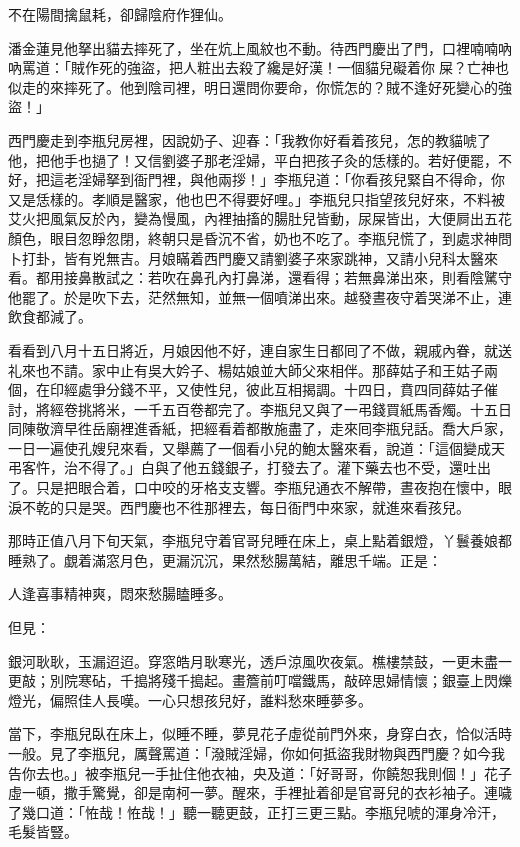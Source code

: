 不在陽間擒鼠耗，卻歸陰府作狸仙。

潘金蓮見他拏出貓去摔死了，坐在炕上風紋也不動。待西門慶出了門，口裡喃喃吶吶罵道：「賊作死的強盜，把人粧出去殺了纔是好漢！一個貓兒礙着你𠳹屎？亡神也似走的來摔死了。他到陰司裡，明日還問你要命，你慌怎的？賊不逢好死變心的強盜！」{}

西門慶走到李瓶兒房裡，因說奶子、迎春：「我教你好看着孩兒，怎的教貓唬了他，把他手也撾了！又信劉婆子那老淫婦，平白把孩子灸的恁樣的。若好便罷，不好，把這老淫婦拏到衙門裡，與他兩拶！」李瓶兒道：「你看孩兒緊自不得命，你又是恁樣的。孝順是醫家，他也巴不得要好哩。」李瓶兒只指望孩兒好來，不料被艾火把風氣反於內，變為慢風，內裡抽搐的腸肚兒皆動，尿屎皆出，大便屙出五花顏色，眼目忽睜忽閉，終朝只是昏沉不省，奶也不吃了。李瓶兒慌了，到處求神問卜打卦，皆有兇無吉。月娘瞞着西門慶又請劉婆子來家跳神，又請小兒科太醫來看。都用接鼻散試之：若吹在鼻孔內打鼻涕，還看得；若無鼻涕出來，則看陰騭守他罷了。於是吹下去，茫然無知，並無一個噴涕出來。越發晝夜守着哭涕不止，連飲食都減了。

看看到八月十五日將近，月娘因他不好，連自家生日都囘了不做，親戚內眷，就送礼來也不請。家中止有吳大妗子、楊姑娘並大師父來相伴。那薛姑子和王姑子兩個，在印經處爭分錢不平，又使性兒，彼此互相揭調。十四日，賁四同薛姑子催討，將經卷挑將米，一千五百卷都完了。李瓶兒又與了一弔錢買紙馬香燭。十五日同陳敬濟早徃岳廟裡進香紙，把經看着都散施盡了，走來囘李瓶兒話。喬大戶家，一日一遍使孔嫂兒來看，又舉薦了一個看小兒的鮑太醫來看，說道：「這個變成天弔客忤，治不得了。」白與了他五錢銀子，打發去了。灌下藥去也不受，還吐出了。只是把眼合着，口中咬的牙格支支響。李瓶兒通衣不解帶，晝夜抱在懷中，眼淚不乾的只是哭。西門慶也不徃那裡去，每日衙門中來家，就進來看孩兒。

那時正值八月下旬天氣，李瓶兒守着官哥兒睡在床上，桌上點着銀燈，丫鬟養娘都睡熟了。覷着滿窓月色，更漏沉沉，果然愁腸萬結，離思千端。正是：

人逢喜事精神爽，悶來愁腸瞌睡多。

但見：

銀河耿耿，玉漏迢迢。穿窓皓月耿寒光，透戶涼風吹夜氣。樵樓禁鼓，一更未盡一更敲；別院寒砧，千搗將殘千搗起。畫簷前叮噹鐵馬，敲碎思婦情懷；銀臺上閃爍燈光，偏照佳人長嘆。一心只想孩兒好，誰料愁來睡夢多。

當下，李瓶兒臥在床上，似睡不睡，夢見花子虛從前門外來，身穿白衣，恰似活時一般。見了李瓶兒，厲聲罵道：「潑賊淫婦，你如何抵盜我財物與西門慶？如今我告你去也。」被李瓶兒一手扯住他衣袖，央及道：「好哥哥，你饒恕我則個！」花子虛一頓，撒手驚覺，卻是南柯一夢。{}醒來，手裡扯着卻是官哥兒的衣衫袖子。連噦了幾口道：「恠哉！恠哉！」聽一聽更鼓，正打三更三點。李瓶兒唬的渾身冷汗，毛髮皆豎。

